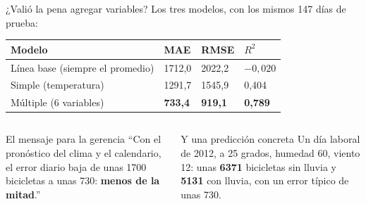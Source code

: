 \documentclass[aspectratio=169,11pt]{beamer}
\begin{document}
\begin{frame}[t]{¿Valió la pena agregar variables?}
  \small
  Los tres modelos, con los mismos 147 días de prueba:
  \vspace{0.1cm}

  \footnotesize
  \renewcommand{\arraystretch}{1.2}
  \begin{tabular}{@{}L{5.2cm}R{1.8cm}R{1.8cm}R{1.6cm}@{}}
    \toprule
    \textbf{Modelo} & \textbf{MAE} & \textbf{RMSE} & \textbf{$R^2$} \\
    \midrule
    Línea base (siempre el promedio) & 1712,0 & 2022,2 & $-0{,}020$ \\
    Simple (temperatura) & 1291,7 & 1545,9 & 0,404 \\
    Múltiple (6 variables) & \textbf{733,4} & \textbf{919,1} & \textbf{0,789} \\
    \bottomrule
  \end{tabular}
  \vspace{0.2cm}

  \begin{columns}[T,onlytextwidth]
    \begin{exampleblock}{El mensaje para la gerencia}
      \footnotesize ``Con el pronóstico del clima y el calendario, el error
      diario baja de unas 1700 bicicletas a unas 730: \textbf{menos de la mitad}.''
    \end{exampleblock}
    \begin{block}{Y una predicción concreta}
      \footnotesize Un día laboral de 2012, a 25 grados, humedad 60, viento
      12: unas \textbf{6371} bicicletas sin lluvia y \textbf{5131} con
      lluvia, con un error típico de unas 730.
    \end{block}
  \end{columns}
\end{frame}

\end{document}
